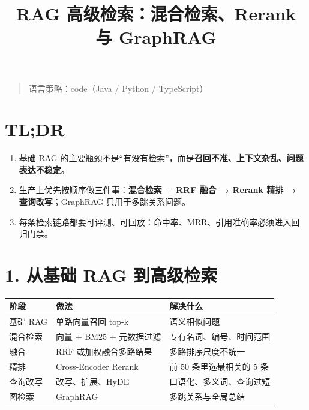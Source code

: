 \documentclass[9pt,a4paper,twocolumn]{ctexart}
\begin{document}
\title{RAG 高级检索：混合检索、Rerank 与 GraphRAG}
\date{}
\maketitle
{}

\begin{quote}
语言策略：code（Java / Python / TypeScript）
\end{quote}



\section*{TL;DR}

\begin{enumerate}[itemsep=1pt, topsep=2pt]
  \item 基础 RAG 的主要瓶颈不是“有没有检索”，而是\textbf{召回不准、上下文杂乱、问题表达不稳定}。
  \item 生产上优先按顺序做三件事：\textbf{混合检索 + RRF 融合 → Rerank 精排 → 查询改写}；GraphRAG 只用于多跳关系问题。
  \item 每条检索链路都要可评测、可回放：命中率、MRR、引用准确率必须进入回归门禁。
\end{enumerate}


\section*{1. 从基础 RAG 到高级检索}

{\footnotesize
\begin{tabular}{|p{}|p{}|p{}|}
\hline
\textbf{阶段} & \textbf{做法} & \textbf{解决什么} \\
\hline
基础 RAG & 单路向量召回 top-k & 语义相似问题 \\
\hline
混合检索 & 向量 + BM25 + 元数据过滤 & 专有名词、编号、时间范围 \\
\hline
融合 & RRF 或加权融合多路结果 & 多路排序尺度不统一 \\
\hline
精排 & Cross-Encoder Rerank & 前 50 条里选最相关的 5 条 \\
\hline
查询改写 & 改写、扩展、HyDE & 口语化、多义词、查询过短 \\
\hline
图检索 & GraphRAG & 多跳关系与全局总结 \\
\hline
\end{tabular}
}
\end{document}
